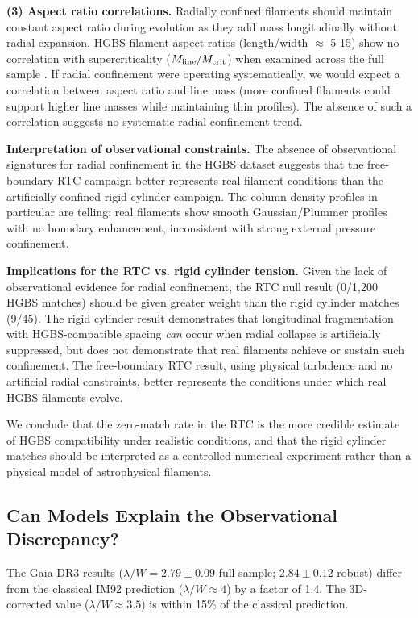 \documentclass[twocolumn]{mnras}
\begin{document}
\textbf{(3) Aspect ratio correlations.}
Radially confined filaments should maintain constant aspect ratio during evolution as they add mass longitudinally without radial expansion. HGBS filament aspect ratios (length/width $\approx$ 5-15) show no correlation with supercriticality ($M_{\rm line}/M_{\rm crit}$) when examined across the full sample \citep{Arzoumanian2019}. If radial confinement were operating systematically, we would expect a correlation between aspect ratio and line mass (more confined filaments could support higher line masses while maintaining thin profiles). The absence of such a correlation suggests no systematic radial confinement trend.

\textbf{Interpretation of observational constraints.}
The absence of observational signatures for radial confinement in the HGBS dataset suggests that the free-boundary RTC campaign better represents real filament conditions than the artificially confined rigid cylinder campaign. The column density profiles in particular are telling: real filaments show smooth Gaussian/Plummer profiles with no boundary enhancement, inconsistent with strong external pressure confinement.

\textbf{Implications for the RTC vs. rigid cylinder tension.}
Given the lack of observational evidence for radial confinement, the RTC null result (0/1,200 HGBS matches) should be given greater weight than the rigid cylinder matches (9/45). The rigid cylinder result demonstrates that longitudinal fragmentation with HGBS-compatible spacing \textit{can} occur when radial collapse is artificially suppressed, but does not demonstrate that real filaments achieve or sustain such confinement. The free-boundary RTC result, using physical turbulence and no artificial radial constraints, better represents the conditions under which real HGBS filaments evolve.

We conclude that the zero-match rate in the RTC is the more credible estimate of HGBS compatibility under realistic conditions, and that the rigid cylinder matches should be interpreted as a controlled numerical experiment rather than a physical model of astrophysical filaments.

\subsection{Can Models Explain the Observational Discrepancy?}

The Gaia DR3 results ($\lambda/W = 2.79 \pm 0.09$ full sample; $2.84 \pm 0.12$ robust) differ from the classical IM92 prediction ($\lambda/W \approx 4$) by a factor of 1.4. The 3D-corrected value ($\lambda/W \approx 3.5$) is within 15\% of the classical prediction.
\end{document}
